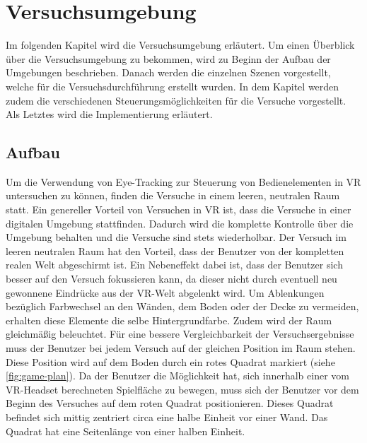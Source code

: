 
\chapter{Versuchsumgebung}
\label{section:versuchsumgebung}

Im folgenden Kapitel wird die Versuchsumgebung erläutert. Um einen Überblick über die Versuchsumgebung zu bekommen, wird zu Beginn der Aufbau der Umgebungen beschrieben. Danach werden die einzelnen Szenen vorgestellt, welche für die Versuchsdurchführung erstellt wurden. In dem Kapitel werden zudem die verschiedenen Steuerungsmöglichkeiten für die Versuche vorgestellt. Als Letztes wird die Implementierung erläutert. 

\section{Aufbau}
Um die Verwendung von Eye-Tracking zur Steuerung von Bedienelementen in \ac{VR} untersuchen zu können, finden die Versuche in einem leeren, neutralen Raum statt. Ein genereller Vorteil von Versuchen in \ac{VR} ist, dass die Versuche in einer digitalen Umgebung stattfinden. Dadurch wird die komplette Kontrolle über die Umgebung behalten und die Versuche sind stets wiederholbar. Der Versuch im leeren neutralen Raum hat den Vorteil, dass der Benutzer von der kompletten realen Welt abgeschirmt ist. Ein Nebeneffekt dabei ist, dass der Benutzer sich besser auf den Versuch fokussieren kann, da dieser nicht durch eventuell neu gewonnene Eindrücke aus der \ac{VR}-Welt abgelenkt wird. Um Ablenkungen bezüglich Farbwechsel an den Wänden, dem Boden oder der Decke zu vermeiden, erhalten diese Elemente die selbe Hintergrundfarbe. Zudem wird der Raum gleichmäßig beleuchtet. Für eine bessere Vergleichbarkeit der Versuchsergebnisse muss der Benutzer bei jedem Versuch auf der gleichen Position im Raum stehen. Diese Position wird auf dem Boden durch ein rotes Quadrat markiert (siehe \autoref{fig:game-plan}). Da der Benutzer die Möglichkeit hat, sich innerhalb einer vom \ac{VR}-Headset berechneten Spielfläche zu bewegen, muss sich der Benutzer vor dem Beginn des Versuches auf dem roten Quadrat positionieren. Dieses Quadrat befindet sich mittig zentriert circa eine halbe Einheit vor einer Wand. Das Quadrat hat eine Seitenlänge von einer halben Einheit.

